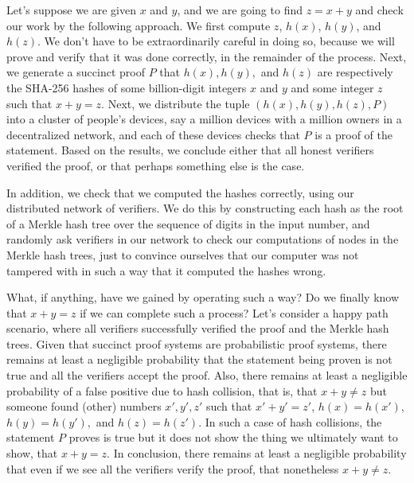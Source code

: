 \documentclass[11pt]{article}
\begin{document}
Let's suppose we are given $x$ and $y$, and we are going to find $z = x + y$ and check
our work by the following approach. We first compute $z$, $h(x)$, $h(y)$, and $h(z)$.
We don't have to be extraordinarily careful in doing so, because we will prove and verify
that it was done correctly, in the remainder of the process. Next, we generate
a succinct proof $P$ that $h(x), h(y),$ and $h(z)$ are respectively the SHA-256
hashes of some billion-digit integers $x$ and $y$ and some integer $z$ such that
$x + y = z$. Next, we distribute the tuple $(h(x), h(y), h(z), P)$ into a cluster of
people's devices, say a million devices with a million owners in a decentralized
network, and each of these devices checks that $P$ is a proof of the statement.
Based on the results, we conclude either that all honest verifiers verified the proof,
or that perhaps something else is the case.

In addition, we check that we computed the hashes correctly, using our distributed 
network of verifiers. We do this by constructing each hash as the root of a Merkle
hash tree over the sequence of digits in the input number, and randomly ask verifiers
in our network to check our computations of nodes in the Merkle hash trees, just
to convince ourselves that our computer was not tampered with in such a way that it
computed the hashes wrong.

What, if anything, have we gained by operating such a way? Do we finally know that
$x + y = z$ if we can complete such a process? Let's consider a happy path scenario,
where all verifiers successfully verified the proof and the Merkle hash trees.
Given that succinct proof systems are probabilistic proof systems, there remains at
least a negligible probability that the statement being proven is not true and all
the verifiers accept the proof. Also,
there remains at least a negligible probability of a false positive due to hash collision,
that is, that $x + y \neq z$ but someone found (other) numbers $x', y', z'$ such
that $x' + y' = z'$, $h(x) = h(x')$, $h(y) = h(y'),$ and $h(z) = h(z')$. In such a
case of hash collisions, the statement $P$ proves is true but it does not show the
thing we ultimately want to show, that $x + y = z$. In conclusion, there remains at least a negligible
probability that even if we see all the verifiers verify the proof, that nonetheless
$x + y \neq z$.
\end{document}
